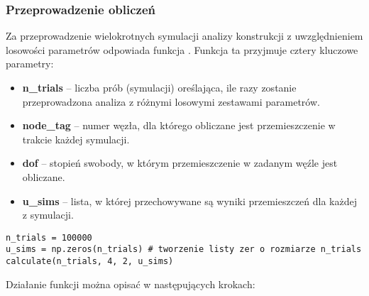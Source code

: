 \subsubsection{Przeprowadzenie obliczeń}

Za przeprowadzenie wielokrotnych symulacji analizy konstrukcji z uwzględnieniem losowości parametrów odpowiada funkcja . Funkcja ta przyjmuje cztery kluczowe parametry:

\begin{itemize}
    \item \textbf{n\_trials} – liczba prób (symulacji) oreślająca, ile razy zostanie przeprowadzona analiza z różnymi losowymi zestawami parametrów.
    \item \textbf{node\_tag} – numer węzła, dla którego obliczane jest przemieszczenie w trakcie każdej symulacji.
    \item \textbf{dof} – stopień swobody, w którym przemieszczenie w zadanym węźle jest obliczane.
    \item \textbf{u\_sims} – lista, w której przechowywane są wyniki przemieszczeń dla każdej z symulacji.
\end{itemize}

\begin{lstlisting}
n_trials = 100000
u_sims = np.zeros(n_trials) # tworzenie listy zer o rozmiarze n_trials
calculate(n_trials, 4, 2, u_sims)
\end{lstlisting}
Działanie funkcji można opisać w następujących krokach:

